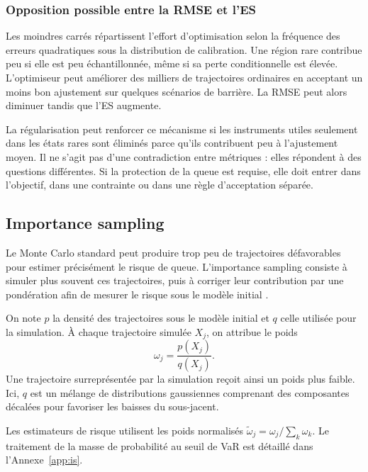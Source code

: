 \documentclass[12pt,a4paper]{article}
\newcommand{\1}{\mathbf{1}}
\begin{document}
\subsubsection*{Opposition possible entre la RMSE et l'ES}

Les moindres carrés répartissent l'effort d'optimisation selon la fréquence des
erreurs quadratiques sous la distribution de calibration. Une région rare contribue
peu si elle est peu échantillonnée, même si sa perte conditionnelle est élevée.
L'optimiseur peut améliorer des milliers de trajectoires ordinaires en acceptant
un moins bon ajustement sur quelques scénarios de barrière. La RMSE peut alors
diminuer tandis que l'ES augmente.

La régularisation peut renforcer ce mécanisme si les instruments utiles seulement
dans les états rares sont éliminés parce qu'ils contribuent peu à l'ajustement moyen.
Il ne s'agit pas d'une contradiction entre métriques : elles répondent à des
questions différentes. Si la protection de la queue est requise, elle doit entrer
dans l'objectif, dans une contrainte ou dans une règle d'acceptation séparée.

\subsection{Importance sampling}

Le Monte Carlo standard peut produire trop peu de trajectoires défavorables pour estimer précisément le risque de queue. L'importance sampling consiste à simuler plus souvent ces trajectoires, puis à corriger leur contribution par une pondération afin de mesurer le risque sous le modèle initial \cite{glasserman2004}.

On note $p$ la densité des trajectoires sous le modèle initial et $q$ celle utilisée pour la simulation. À chaque trajectoire simulée $X_j$, on attribue le poids
\begin{equation}
 \omega_j=\frac{p(X_j)}{q(X_j)}.
\label{eq:likelihood-ratio}
\end{equation}
Une trajectoire surreprésentée par la simulation reçoit ainsi un poids plus faible. Ici, $q$ est un mélange de distributions gaussiennes comprenant des composantes décalées pour favoriser les baisses du sous-jacent.

Les estimateurs de risque utilisent les poids normalisés $\widetilde{\omega}_j=\omega_j/\sum_k\omega_k$. Le traitement de la masse de probabilité au seuil de VaR est détaillé dans l'Annexe~\ref{app:is}.
\end{document}

